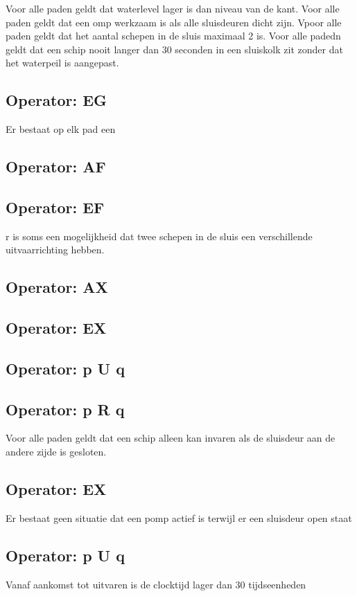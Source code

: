 \documentclass{article}
\begin{document}
	Voor alle paden geldt dat waterlevel lager is dan niveau van de kant.
	Voor alle paden geldt dat een omp werkzaam is als alle sluisdeuren dicht zijn.
	Vpoor alle paden geldt dat het aantal schepen in de sluis maximaal 2 is.
	Voor alle padedn  geldt dat een schip nooit langer dan 30 seconden in een sluiskolk zit zonder dat het waterpeil is aangepast.
	\subsection{Operator: EG}
	Er bestaat op elk pad een 

	\subsection{Operator: AF}
	
	\subsection{Operator: EF}
	r is soms een mogelijkheid dat twee schepen in de sluis een verschillende uitvaarrichting hebben.
	\subsection{Operator: AX}

	
	\subsection{Operator: EX}
	
	\subsection{Operator: p U q}
	
	\subsection{Operator: p R q}
	

	Voor alle paden geldt dat een schip alleen kan invaren als de sluisdeur aan de andere zijde is gesloten.
	\subsection{Operator: EX}
	Er bestaat geen situatie dat een pomp actief is terwijl er een sluisdeur open staat
	\subsection{Operator: p U q}
	Vanaf aankomst tot uitvaren is de clocktijd lager dan 30 tijdseenheden 
\end{document}
